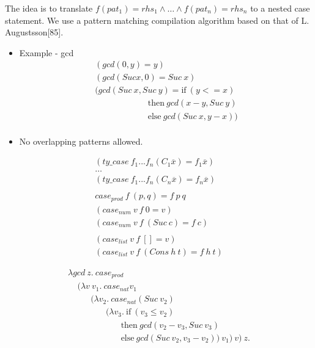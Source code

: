 \begin{slide}

The idea is to translate $f(pat_1) = rhs_1 \land \ldots \land f(pat_n) = rhs_n$
to a nested case statement. We use a pattern matching compilation
algorithm based on that of L. Augustsson[85]. 

\begin{itemize}
\item Example - gcd
\[
\begin{array}{l}
 (gcd (0,y)      = y)\\
 (gcd (Suc x, 0) = Suc\  x)\\
 (gcd (Suc\  x, Suc\  y) = \mbox{if}\ (y <= x) \\
{~~~~~~~~~~~~~~~~~~~~~~~~~~~~}\mbox{then}\ gcd(x-y, Suc\  y)  \\
{~~~~~~~~~~~~~~~~~~~~~~~~~~~~}\mbox{else}\ gcd(Suc\  x, y-x)) \\
\end{array}
\]
\item No overlapping patterns allowed.
\end{itemize}
\end{slide}

\begin{slide}
\medskip
\[
\begin{array}{l}
(ty\_case\ f_1 ... f_n (C_1 \overline{x}) = f_1\overline{x})  \\
   \ldots \\
(ty\_case\ f_1 ... f_n (C_n\overline{x}) = f_n\overline{x}) \\
\\
case_{prod}\ f\ (p,q) = f\ p\ q
\\
(case_{num}\ v\ f\ 0 = v) \\
(case_{num}\ v\ f\ (Suc\ c) = f\ c) \\
\\
(case_{list}\ v\ f\ [] = v) \\
(case_{list}\ v\ f\ (Cons\ h\ t) = f\ h\ t)
\end{array}
\]

\end{slide}

\begin{slide}
\[
\begin{array}{l}
\lambda gcd\ z.\ case_{prod}\\
{~~~~~} (\lambda v\ v_1.\ case_{nat} v_1  \\
{~~~~~~~~~~~~} (\lambda v_2.\ case_{nat} (Suc\  v_2)   \\
{~~~~~~~~~~~~~~~~~~~~}          (\lambda v_3.\ \mbox{if}\ (v_3 \leq v_2) \\
{~~~~~~~~~~~~~~~~~~~~~~~~~~~~}\mbox{then}\ gcd(v_2-v_3,Suc\  v_3) \\
{~~~~~~~~~~~~~~~~~~~~~~~~~~~~}\mbox{else}\ gcd(Suc\ v_2, v_3-v_2))\ v_1)\ v)\ z.
\end{array}
\]
\end{slide}

